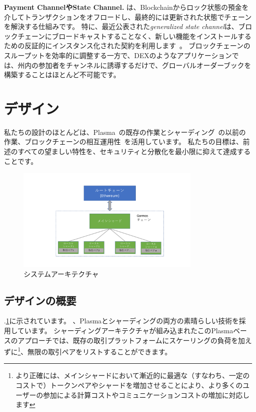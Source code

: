 \textbf{Payment ChannelやState Channel.}\cite{lightning, miller2017sprites} は、Blockchainからロック状態の預金を介してトランザクションをオフロードし、最終的には更新された状態でチェーンを解決する仕組みです。 特に、最近公表された\textit{generalized state channel}は、ブロックチェーンにブロードキャストすることなく、新しい機能をインストールするための反証的にインスタンス化された契約を利用します~\cite{Coleman2018, Dziembowski2018}。 ブロックチェーンのスループットを効率的に調整する一方で、DEXのようなアプリケーションでは、州内の参加者をチャンネルに誘導するだけで、グローバルオーダーブックを構築することはほとんど不可能です。


\section{デザイン}

私たちの設計のほとんどは、Plasma~\cite{plasma}の既存の作業とシャーディング~\cite{elastico}の以前の作業、ブロックチェーンの相互運用性~\cite{peacerelay}を活用しています。 私たちの目標は、前述のすべての望ましい特性を、セキュリティと分散化を最小限に抑えて達成することです。


\begin{figure}[t]
  \centering
  \includegraphics[width=0.8\textwidth]{images//architecture}
  \caption{\codename システムアーキテクチャ}
  \label{architecture}
\end{figure}


\subsection{デザインの概要}

.\ref{architecture}に示されています。 、Plasmaとシャーディングの両方の素晴らしい技術を採用しています。 シャーディングアーキテクチャが組み込まれたこのPlasmaベースのアプローチでは、既存の取引プラットフォームにスケーリングの負荷を加えずに\footnote{より正確には、メインシャードにおいて漸近的に最適な（すなわち、一定のコストで）トークンペアやシャードを増加させることにより、より多くのユーザーの参加による計算コストやコミュニケーションコストの増加に対応します}、無限の取引ペアをリストすることができます。

